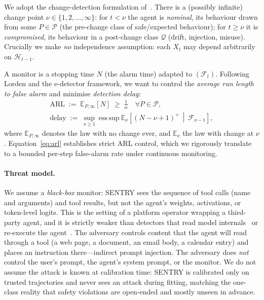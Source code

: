 \documentclass[10pt,journal,compsoc]{IEEEtran}
\theoremstyle{plain}
\theoremstyle{definition}
\newcommand{\Ecal}{\mathbb{E}}
\newcommand{\Pcal}{\mathcal{P}}
\newcommand{\Qcal}{\mathcal{Q}}
\newcommand{\Fcal}{\mathcal{F}}
\newcommand{\Hcal}{\mathcal{H}}
\begin{document}
We adopt the change-detection formulation of~\cite{shin2023edetectors}. There
is a (possibly infinite) change point \(\nu\in\{1,2,\dots,\infty\}\): for
\(t<\nu\) the agent is \emph{nominal}, its behaviour drawn from some
\(P\in\Pcal\) (the pre-change class of safe/expected behaviour); for
\(t\ge\nu\) it is \emph{compromised}, its behaviour in a post-change class
\(\Qcal\) (drift, injection, misuse). Crucially we make \emph{no} independence
assumption: each \(X_t\) may depend arbitrarily on \(\Hcal_{t-1}\).

A monitor is a stopping time \(N\) (the alarm time) adapted to
\((\Fcal_t)\). Following Lorden and the e-detector framework, we want to
control the \emph{average run length to false alarm} and minimise
\emph{detection delay}:
\begin{align}
\text{ARL} \;:=\; \Ecal_{P,\infty}[N] \;\ge\; \tfrac{1}{\alpha}
   \quad \forall P\in\Pcal,
   \label{eq:arl}\\
\text{delay} \;:=\; \sup_{\nu\ge 1}\ \mathrm{ess\,sup}\
   \Ecal_{\nu}\!\left[(N-\nu+1)^{+}\,\middle|\,\Fcal_{\nu-1}\right],
   \label{eq:delay}
\end{align}
where \(\Ecal_{P,\infty}\) denotes the law with no change ever, and
\(\Ecal_\nu\) the law with change at \(\nu\). Equation~\eqref{eq:arl} establishes 
strict ARL control, which we rigorously translate to a bounded per-step false-alarm 
rate under continuous monitoring.

\paragraph{Threat model.} We assume a \emph{black-box} monitor: SENTRY sees
the sequence of tool calls (name and arguments) and tool results, but not the
agent's weights, activations, or token-level logits. This is the setting of a
platform operator wrapping a third-party agent, and it is strictly weaker than
detectors that read model internals~\cite{belenky2026cheap} or re-execute the
agent~\cite{zhu2025melon}. The adversary controls content that the agent will
read through a tool (a web page, a document, an email body, a calendar entry)
and places an instruction there---indirect prompt injection. The adversary
does \emph{not} control the user's prompt, the agent's system prompt, or the
monitor. We do not assume the attack is known at calibration time: SENTRY is
calibrated only on trusted trajectories and never sees an attack during
fitting, matching the one-class reality that safety violations are open-ended
and mostly unseen in advance.
\end{document}
